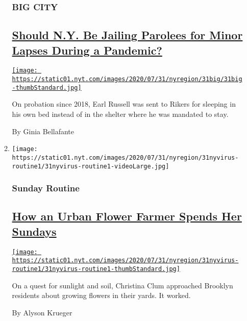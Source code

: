 \begin{enumerate}
\begin{enumerate}
    \hypertarget{big-city}{%
    \subsubsection{BIG CITY}\label{big-city}}

    \hypertarget{should-ny-be-jailing-parolees-for-minor-lapses-during-a-pandemic}{%
    \subsection{\texorpdfstring{\href{/2020/07/31/nyregion/ny-parole-violations.html}{Should
    N.Y. Be Jailing Parolees for Minor Lapses During a
    Pandemic?}}{Should N.Y. Be Jailing Parolees for Minor Lapses During a Pandemic?}}\label{should-ny-be-jailing-parolees-for-minor-lapses-during-a-pandemic}}

    \href{/2020/07/31/nyregion/ny-parole-violations.html}{\texttt{[image: https://static01.nyt.com/images/2020/07/31/nyregion/31big/31big-thumbStandard.jpg]}}

    On probation since 2018, Earl Russell was sent to Rikers for
    sleeping in his own bed instead of in the shelter where he was
    mandated to stay.

    By Ginia Bellafante
  \item
    \texttt{[image: https://static01.nyt.com/images/2020/07/31/nyregion/31nyvirus-routine1/31nyvirus-routine1-videoLarge.jpg]}

    \hypertarget{sunday-routine}{%
    \subsubsection{Sunday Routine}\label{sunday-routine}}

    \hypertarget{how-an-urban-flower-farmer-spends-her-sundays}{%
    \subsection{\texorpdfstring{\href{/2020/07/31/nyregion/urban-gardening-nyc.html}{How
    an Urban Flower Farmer Spends Her
    Sundays}}{How an Urban Flower Farmer Spends Her Sundays}}\label{how-an-urban-flower-farmer-spends-her-sundays}}

    \href{/2020/07/31/nyregion/urban-gardening-nyc.html}{\texttt{[image: https://static01.nyt.com/images/2020/07/31/nyregion/31nyvirus-routine1/31nyvirus-routine1-thumbStandard.jpg]}}

    On a quest for sunlight and soil, Christina Clum approached Brooklyn
    residents about growing flowers in their yards. It worked.

    By Alyson Krueger
  \end{enumerate}
\end{enumerate}

